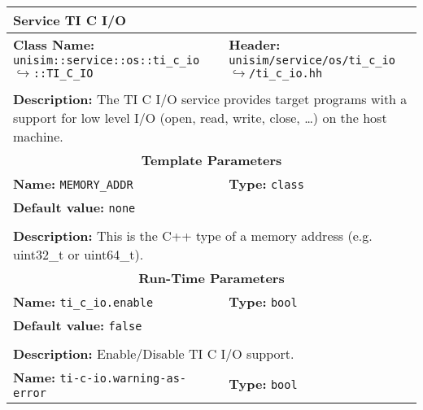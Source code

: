 \newpage
\begin{center}
	\begin{tabular}{|p{7.5cm}|p{7.5cm}|}
		\hline
		\multicolumn{2}{|l|}{\textbf{\Large Service TI C I/O}}\\
		\hline
		\multicolumn{1}{|p{7.5cm}}{\textbf{Class Name:} \newline \texttt{unisim::service::os::ti\_c\_io}\newline$\hookrightarrow$\texttt{::TI\_C\_IO}} & \multicolumn{1}{p{7.5cm}|}{\textbf{Header:} \newline \texttt{unisim/service/os/ti\_c\_io}\newline$\hookrightarrow$\texttt{/ti\_c\_io.hh}}\\
		\multicolumn{2}{|l|}{}\\
		\multicolumn{2}{|p{15cm}|}{\textbf{Description:} \newline The TI C I/O service provides target programs with a support for low level I/O (open, read, write, close, \ldots) on the host machine.}\\
		\hline
		\hline
		\multicolumn{2}{|c|}{\textbf{\large Template Parameters}}\\
		\hline
		\multicolumn{1}{|p{7.5cm}}{\textbf{Name:} \texttt{MEMORY\_ADDR}} & \multicolumn{1}{p{7.5cm}|}{\textbf{Type:} \texttt{class}}\\
		\multicolumn{2}{|p{15cm}|}{\textbf{Default value:} \texttt{none}}\\
		\multicolumn{2}{|l|}{}\\
		\multicolumn{2}{|p{15cm}|}{\textbf{Description:} \newline This is the C++ type of a memory address (e.g. uint32\_t or uint64\_t).}\\
		\hline
		\hline
		\multicolumn{2}{|c|}{\textbf{\large Run-Time Parameters}}\\
		\hline
		\multicolumn{1}{|p{7.5cm}}{\textbf{Name:} \texttt{ti\_c\_io.enable}} & \multicolumn{1}{p{7.5cm}|}{\textbf{Type:} \texttt{bool}}\\
		\multicolumn{2}{|p{15cm}|}{\textbf{Default value:} \texttt{false}}\\
		\multicolumn{2}{|l|}{}\\
		\multicolumn{2}{|p{15cm}|}{\textbf{Description:} \newline Enable/Disable TI C I/O support.}\\
		\hline
		\multicolumn{1}{|p{7.5cm}}{\textbf{Name:} \texttt{ti-c-io.warning-as-error}} & \multicolumn{1}{p{7.5cm}|}{\textbf{Type:} \texttt{bool}}\\

\end{tabular}
\end{center}
